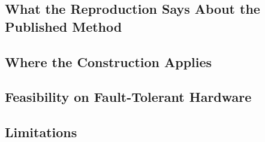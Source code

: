 \subsection{What the Reproduction Says About the Published Method}
\label{sec:disc-reproduction}

\subsection{Where the Construction Applies}
\label{sec:disc-applicability}

\subsection{Feasibility on Fault-Tolerant Hardware}
\label{sec:disc-feasibility}

\subsection{Limitations}
\label{sec:limitations}

